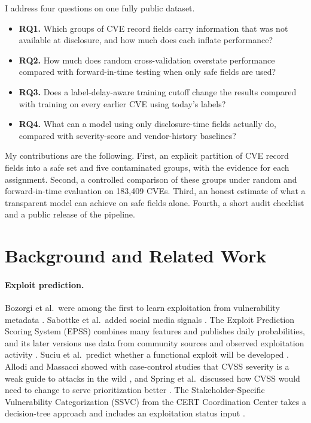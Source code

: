 \documentclass[11pt,a4paper]{article}
\begin{document}
I address four questions on one fully public dataset.
\begin{itemize}
\item \textbf{RQ1.} Which groups of CVE record fields carry information that was not available at disclosure, and how much does each inflate performance?
\item \textbf{RQ2.} How much does random cross-validation overstate performance compared with forward-in-time testing when only safe fields are used?
\item \textbf{RQ3.} Does a label-delay-aware training cutoff change the results compared with training on every earlier CVE using today's labels?
\item \textbf{RQ4.} What can a model using only disclosure-time fields actually do, compared with severity-score and vendor-history baselines?
\end{itemize}

My contributions are the following. First, an explicit partition of CVE record fields into a safe set and five contaminated groups, with the evidence for each assignment. Second, a controlled comparison of these groups under random and forward-in-time evaluation on 183,409 CVEs. Third, an honest estimate of what a transparent model can achieve on safe fields alone. Fourth, a short audit checklist and a public release of the pipeline.

\section{Background and Related Work}

\paragraph{Exploit prediction.} Bozorgi et al.\ were among the first to learn exploitation from vulnerability metadata \cite{bozorgi2010}. Sabottke et al.\ added social media signals \cite{sabottke2015}. The Exploit Prediction Scoring System (EPSS) combines many features and publishes daily probabilities, and its later versions use data from community sources and observed exploitation activity \cite{jacobs2019,jacobs2023}. Suciu et al.\ predict whether a functional exploit will be developed \cite{suciu2022}. Allodi and Massacci showed with case-control studies that CVSS severity is a weak guide to attacks in the wild \cite{allodi2014}, and Spring et al.\ discussed how CVSS would need to change to serve prioritization better \cite{spring2021}. The Stakeholder-Specific Vulnerability Categorization (SSVC) from the CERT Coordination Center takes a decision-tree approach and includes an exploitation status input \cite{ssvc}.
\end{document}
